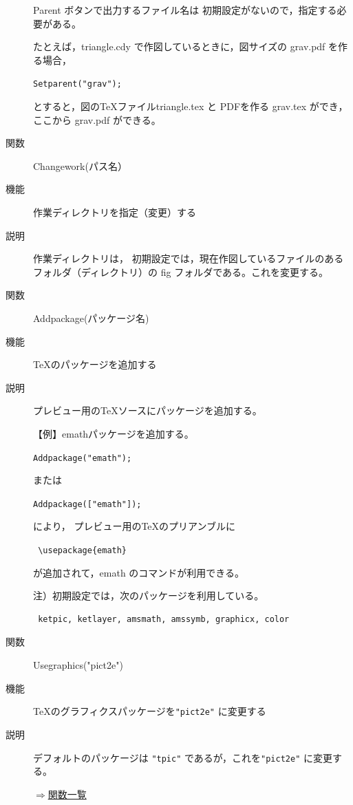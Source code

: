 \documentclass[papersize,a4paper,12pt,uplatex]{jsarticle}
\begin{document}
\begin{description}
Parent ボタンで出力するファイル名は 初期設定がないので，指定する必要がある。

たとえば，triangle.cdy で作図しているときに，図サイズの grav.pdf を作る場合，

\hspace{10mm} \verb|Setparent("grav");|

とすると，図のTeXファイルtriangle.tex と PDFを作る grav.tex ができ，ここから grav.pdf ができる。

\vspace{\baselineskip}
\hypertarget{changework}{}
\item[関数]Changework(パス名）
\item[機能]作業ディレクトリを指定（変更）する
\item[説明]作業ディレクトリは， 初期設定では，現在作図しているファイルのあるフォルダ（ディレクトリ）の fig フォルダである。これを変更する。

\vspace{\baselineskip}
\hypertarget{addpackage}{}
\item[関数]Addpackage(パッケージ名)
\item[機能]TeXのパッケージを追加する
\item[説明]プレビュー用のTeXソースにパッケージを追加する。 

\vspace{\baselineskip}
 【例】emathパッケージを追加する。
 
\hspace{10mm}\verb|Addpackage("emath"); | 
 
 または
 
\hspace{10mm}\verb|Addpackage(["emath"]); | 
 
 により，
プレビュー用のTeXのプリアンブルに

\hspace{10mm}\verb| \usepackage{emath}|

が追加されて，emath のコマンドが利用できる。

\vspace{\baselineskip}
注）初期設定では，次のパッケージを利用している。
\begin{verbatim}
 ketpic, ketlayer, amsmath, amssymb, graphicx, color 
 \end{verbatim}

\vspace{\baselineskip}
\hypertarget{usegraphics}{}
\item[関数]Usegraphics("pict2e")
\item[機能]TeXのグラフィクスパッケージを\verb|"pict2e"| に変更する
\item[説明]デフォルトのパッケージは \verb|"tpic"| であるが，これを\verb|"pict2e"| に変更する。


\begin{flushright}\hyperlink{functionlist}{$\Rightarrow$関数一覧}\end{flushright}

\end{description}
\newpage
\end{document}
